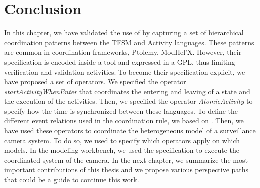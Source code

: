 \section{Conclusion}
In this chapter, we have validated the use of \bcool by capturing a set of hierarchical coordination patterns between the TFSM and Activity languages. These patterns are common in coordination frameworks, \eg Ptolemy, ModHel'X. However, their specification is encoded inside a tool and expressed in a GPL, thus limiting verification and validation activities. To become their specification explicit, we have proposed a set of \bcool operators. We specified the operator \emph{startActivityWhenEnter} that coordinates the entering and leaving of a state and the execution of the activities. Then, we specified the operator \emph{AtomicActivity} to specify how the time is synchronized between these languages. To define the different event relations used in the coordination rule, we based on \moccml. Then, we have used these operators to coordinate the heterogeneous model of a surveillance camera system. To do so, we used \bflow to specify which operators apply on which models. In the modeling workbench, we used the \bflow specification to execute the coordinated system of the camera. In the next chapter, we summarize the most important contributions of this thesis and we propose various perspective paths that could be a guide to continue this work. 

 
